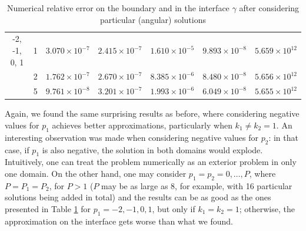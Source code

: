 \begin{table}[!htbp]
\begin{longtable}{ccccccc}
        -2, -1, 0, 1 & 1 & $3.070\times10^{-7}$ & $2.415\times10^{-7}$ & $1.610\times10^{-5}$ & $9.893\times10^{-8}$ & $5.659\times10^{12}$ \\
        & 2 & $1.762\times10^{-7}$ & $2.670\times10^{-7}$ & $8.385\times10^{-6}$ & $8.480\times10^{-8}$ & $5.656\times10^{12}$ \\
        & 5 & $9.761\times10^{-8}$ & $3.201\times10^{-7}$ & $1.993\times10^{-6}$ & $6.049\times10^{-8}$ & $5.655\times10^{12}$ \\
        \midrule[\heavyrulewidth] %
    \end{longtable}
    \caption{Numerical relative error on the boundary and in the interface \(\gamma\) after considering particular (angular) solutions}
    \label{tab:transmission_results_L_shape_axis_particular}
\end{table}

Again, we found the same surprising results as before, where considering negative values for \(p_1\) achieves better approximations, particularly when \(k_1 \neq k_2 = 1\). An interesting observation was made when considering negative values for \(p_2\): in that case, if \(p_1\) is also negative, the solution in both domains would explode. Intuitively, one can treat the problem numerically as an exterior problem in only one domain. On the other hand, one may consider \(p_1 = p_2 = 0, \dots, P\), where \(P=P_1=P_2\), for \(P > 1\) (\(P\) may be as large as 8, for example, with 16 particular solutions being added in total) and the results can be as good as the ones presented in Table \ref{tab:transmission_results_L_shape_axis_particular} for \(p_1=-2, -1, 0, 1\), but only if \(k_1=k_2=1\); otherwise, the approximation on the interface gets worse than what we found. 

